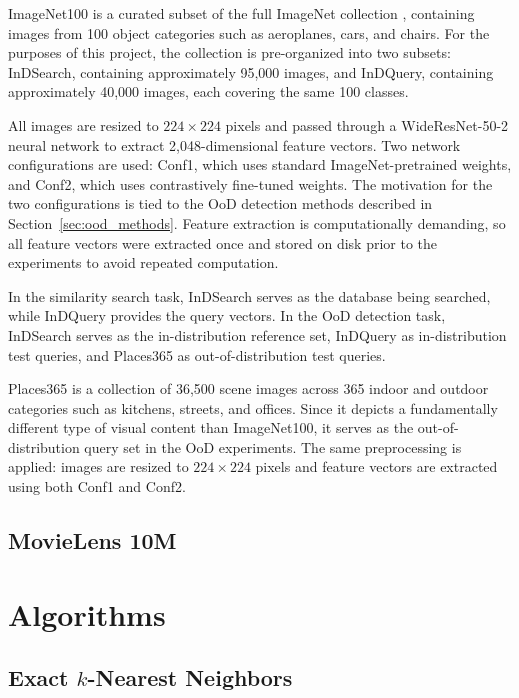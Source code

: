 \documentclass[12pt, a4paper]{report}
\begin{document}
ImageNet100 is a curated subset of the full ImageNet collection \cite{deng2009imagenet}, containing images from 100 object categories such as aeroplanes, cars, and chairs. For the purposes of this project, the collection is pre-organized into two subsets: InDSearch, containing approximately 95,000 images, and InDQuery, containing approximately 40,000 images, each covering the same 100 classes.

All images are resized to $224 \times 224$ pixels and passed through a WideResNet-50-2 neural network \cite{zagoruyko2016wide} to extract 2,048-dimensional feature vectors. Two network configurations are used: Conf1, which uses standard ImageNet-pretrained weights, and Conf2, which uses contrastively fine-tuned weights. The motivation for the two configurations is tied to the OoD detection methods described in Section~\ref{sec:ood_methods}. Feature extraction is computationally demanding, so all feature vectors were extracted once and stored on disk prior to the experiments to avoid repeated computation.

In the similarity search task, InDSearch serves as the database being searched, while InDQuery provides the query vectors. In the OoD detection task, InDSearch serves as the in-distribution reference set, InDQuery as in-distribution test queries, and Places365 as out-of-distribution test queries.

Places365 \cite{zhou2017places} is a collection of 36,500 scene images across 365 indoor and outdoor categories such as kitchens, streets, and offices. Since it depicts a fundamentally different type of visual content than ImageNet100, it serves as the out-of-distribution query set in the OoD experiments. The same preprocessing is applied: images are resized to $224 \times 224$ pixels and feature vectors are extracted using both Conf1 and Conf2.



\subsection{MovieLens 10M}



\section{Algorithms}

\subsection{Exact $k$-Nearest Neighbors}
\end{document}
